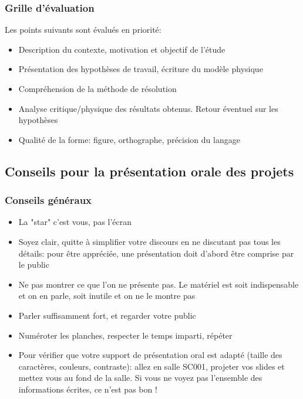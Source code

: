 \begin{appendix}
\subsubsection{Grille d'évaluation}
Les points suivants sont évalués en priorité:
\begin{itemize}
\item Description du contexte, motivation et objectif de l’étude
\item Présentation des hypothèses de travail, écriture du modèle physique
\item Compréhension de la méthode de résolution
\item Analyse critique/physique des résultats obtenus. Retour éventuel sur les hypothèses
\item Qualité de la forme: figure, orthographe, précision du langage
\end{itemize}

\subsection{Conseils pour la présentation orale des projets}

\subsubsection{Conseils généraux}
\begin{itemize}
\item La "star" c’est vous, pas l’écran
\item Soyez clair, quitte à simplifier votre discours en ne discutant pas tous les détails: pour être appréciée, une présentation doit d’abord être comprise par le public
\item Ne pas montrer ce que l’on ne présente pas. Le matériel est soit indispensable et on en parle, soit inutile et on ne le montre pas
\item Parler suffisamment fort, et regarder votre public
\item Numéroter les planches, respecter le temps imparti, répéter
\item Pour vérifier que votre support de présentation oral est adapté (taille des caractères, couleurs, contraste): allez en salle SC001, projeter vos slides et mettez vous au fond de la salle. Si vous ne voyez pas l’ensemble des informations écrites, ce n’est pas bon !
\end{itemize}


\end{appendix}
